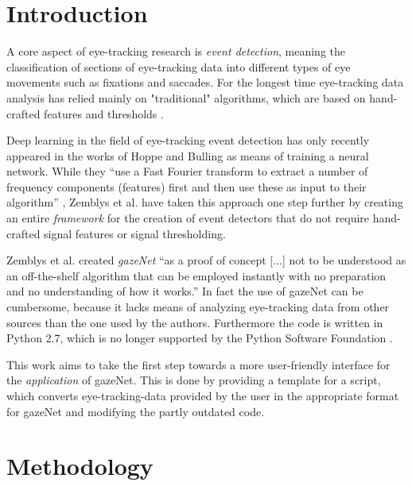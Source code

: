 \documentclass[acmlarge]{acmart}
\begin{document}
\section{Introduction}
A core aspect of eye-tracking research is \emph{event detection}, meaning the classification of sections of eye-tracking data into different types of eye movements such as fixations and saccades. For the longest time eye-tracking data analysis has relied mainly on "traditional" algorithms, which are based on hand-crafted features and thresholds \cite{zemblys2018gazeNet}.

Deep learning in the field of eye-tracking event detection has only recently appeared in the works of Hoppe and Bulling \cite{Hoppe2016EndtoEndEM} as means of training a neural network. While they ``use a Fast Fourier transform to extract a number of frequency components (features) first and then use these as input to their algorithm'' \cite{Hoppe2016EndtoEndEM}, Zemblys et al. \cite{zemblys2018gazeNet} have taken this approach one step further by creating an entire \emph{framework} for the creation of event detectors that do not require hand-crafted signal features or signal thresholding.

Zemblys et al. \cite{zemblys2018gazeNet} created \emph{gazeNet} ``as a proof of concept [...] not to be understood as an off-the-shelf algorithm that can be employed instantly with no preparation and no understanding of how it works.'' \cite{zemblys2018gazeNet} In fact the use of gazeNet can be cumbersome, because it lacks means of analyzing eye-tracking data from other sources than the one used by the authors. Furthermore the code is written in Python 2.7, which is no longer supported by the Python Software Foundation \cite{van_Rossum_2009}.

This work aims to take the first step towards a more user-friendly interface for the \emph{application} of gazeNet. This is done by providing a template for a script, which converts eye-tracking-data provided by the user in the appropriate format for gazeNet and modifying the partly outdated code.


\section{Methodology}
\end{document}
